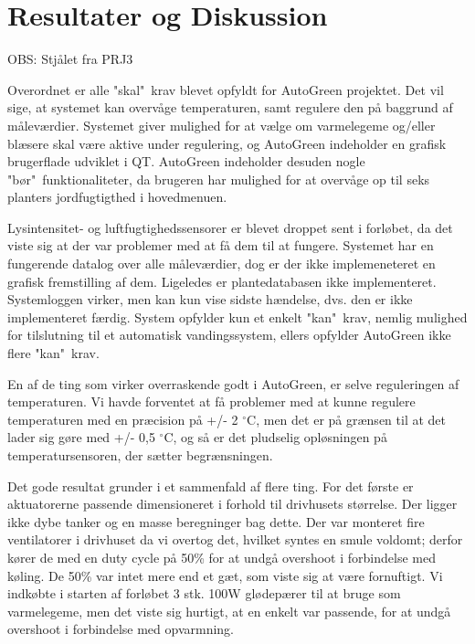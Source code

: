 \chapter{Resultater og Diskussion} \label{ch:Resultater_og_diskussion}

OBS: Stjålet fra PRJ3

Overordnet er alle "skal"\ krav blevet opfyldt for AutoGreen projektet. 
Det vil sige, at systemet kan overvåge temperaturen, samt regulere den på baggrund af måleværdier. 
Systemet giver mulighed for at vælge om varmelegeme og/eller blæsere skal være aktive under regulering, og AutoGreen indeholder en grafisk brugerflade udviklet i QT. 
AutoGreen indeholder desuden nogle "bør"\ funktionaliteter, da brugeren har mulighed for at overvåge op til seks planters jordfugtigthed i hovedmenuen. 

Lysintensitet- og luftfugtighedssensorer er blevet droppet sent i forløbet, da det viste sig at der var problemer med at få dem til at fungere. 
Systemet har en fungerende datalog over alle måleværdier, dog er der ikke implemeneteret en grafisk fremstilling af dem. 
Ligeledes er plantedatabasen ikke implementeret.
Systemloggen virker, men kan kun vise sidste hændelse, dvs. den er ikke implementeret færdig.
System opfylder kun et enkelt "kan"\ krav, nemlig mulighed for tilslutning til et automatisk vandingssystem, ellers opfylder AutoGreen ikke flere "kan"\ krav. 

\mbox{}

En af de ting som virker overraskende godt i AutoGreen, er selve reguleringen af temperaturen. 
Vi havde forventet at få problemer med at kunne regulere temperaturen med en præcision på +/- 2 $^{\circ}$C, men det er på grænsen til at det lader sig gøre med +/- 0,5 $^{\circ}$C, og så er det pludselig opløsningen på temperatursensoren, der sætter begrænsningen. 

Det gode resultat grunder i et sammenfald af flere ting. 
For det første er aktuatorerne passende dimensioneret i forhold til drivhusets størrelse. 
Der ligger ikke dybe tanker og en masse beregninger bag dette. 
Der var monteret fire ventilatorer i drivhuset da vi overtog det, hvilket syntes en smule voldomt; derfor kører de med en duty cycle på 50\% for at undgå overshoot i forbindelse med køling.
De 50\% var intet mere end et gæt, som viste sig at være fornuftigt.
Vi indkøbte i starten af forløbet 3 stk. 100W glødepærer til at bruge som varmelegeme, men det viste sig hurtigt, at en enkelt var passende, for at undgå overshoot i forbindelse med opvarmning.  


